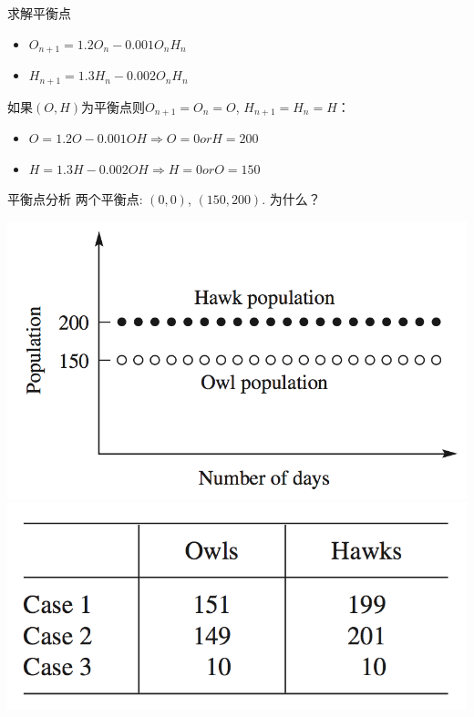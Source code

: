 \documentclass[UTF8, mathserif]{ctexbeamer}
\begin{document}
\begin{frame}{求解平衡点}
  \begin{definition}
    \begin{itemize}
    \item $O_{n+1}=1.2O_n - 0.001O_nH_n$
    \item $H_{n+1}=1.3H_n - 0.002O_nH_n$
    \end{itemize}
  \end{definition}

  如果$(O,H)$为平衡点则$O_{n+1}=O_n=O$, $H_{n+1}=H_n=H$：

  \begin{itemize}
  \item $O=1.2O - 0.001OH \Rightarrow O = 0 or H = 200$ 
  \item $H=1.3H - 0.002OH \Rightarrow H = 0 or O = 150$
  \end{itemize}

\end{frame}

\begin{frame}{平衡点分析}
  两个平衡点: $(0, 0)$, $(150, 200)$. 为什么？

  \begin{center}
    \includegraphics[width=.4\textwidth{}]{owl.png}
    \includegraphics[height=.2\textwidth{}]{owl-start.png}
  \end{center}  

\end{frame}
\end{document}
